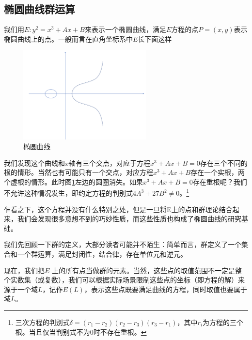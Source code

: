 \documentclass[12pt]{article}
\newcommand{\ec}{椭圆曲线}
\begin{document}
\subsection{\ec 群运算}
我们用$E:y^2=x^3+Ax+B$来表示一个椭圆曲线，满足$E$方程的点$P=(x,y)$表示椭圆曲线上的点。一般而言在直角坐标系中$E$长下面这样
\begin{figure}[H]
	\centering
	\label{fig:ecshape}
	\includegraphics[width=0.6\textwidth]{../common/ecshape.png}
	\caption{\ec}
\end{figure}
我们发现这个曲线和$x$轴有三个交点，对应于方程$x^3+Ax+B=0$存在三个不同的根的情形。当然也有可能只有一个交点，对应方程$x^3+Ax+B$存在一个实根，两个虚根的情形。此时图\ref{fig:ecshape}左边的圆圈消失。如果$x^3+Ax+B=0$存在重根呢？我们不允许这种情况发生，即约定方程的判别式$4A^3+27B^2 \neq 0$。\footnote{三次方程的判别式$\delta=(r_1-r_2)(r_2-r_3)(r_3-r_1)$，其中$r_i$为方程的三个根。当且仅当判别式不为0时不存在重根。}

乍看之下，这个方程并没有什么特别之处，但是一旦将E上的点和群理论结合起来，我们会发现很多意想不到的巧妙性质，而这些性质也构成了\ec 的研究基础。

我们先回顾一下群的定义，大部分读者可能并不陌生：简单而言，群定义了一个集合和一个群运算，满足封闭性，结合律，存在单位元和逆元。

现在，我们把$E$ 上的所有点当做群的元素。当然，这些点的取值范围不一定是整个实数集（或复数），我们可以根据实际场景限制这些点的坐标（即方程的解）来源于一个域$L$，记作$E(L)$，表示这些点既要满足曲线的方程，同时取值也要属于域$L$。
\end{document}
